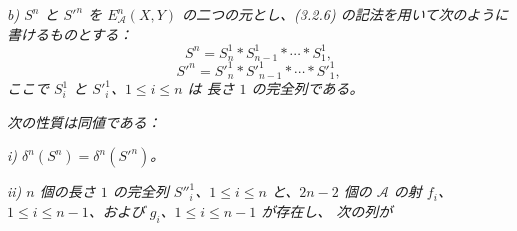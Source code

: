 \noindent\textit{b) $S^n$ と ${S'}^n$ を
$E_{\mathcal A}^{n}(X,Y)$ の二つの元とし、(3.2.6) の記法を用いて次のように
書けるものとする：}
\[
S^n=S_n^1*S_{n-1}^1*\cdots*S_1^1,
\]
\[
{S'}^n={S'}_n^1*{S'}_{n-1}^1*\cdots*{S'}_1^1,
\]
\noindent\textit{ここで $S_i^1$ と ${S'}_i^1$、$1\leq i\leq n$ は
長さ $1$ の完全列である。}

\noindent\textit{次の性質は同値である：}

\noindent\textit{i) $\delta^n(S^n)=\delta^n({S'}^n)$。}

\noindent\textit{ii) $n$ 個の長さ $1$ の完全列
${S''}_i^1$、$1\leq i\leq n$ と、$2n-2$ 個の $\mathcal A$ の射
$f_i$、$1\leq i\leq n-1$、および $g_i$、$1\leq i\leq n-1$ が存在し、
次の列が}
\endgroup
